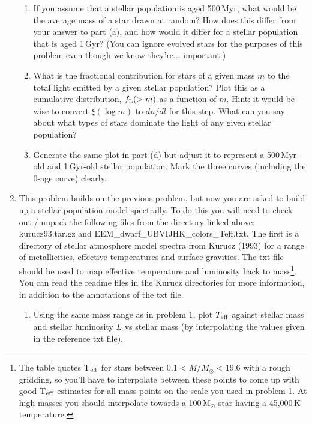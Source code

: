 \documentclass[11pt]{article}
\begin{document}
\begin{enumerate}
\begin{enumerate}
    \item If you assume that a stellar population is aged 500\,Myr,
      what would be the average mass of a star drawn at random?  How
      does this differ from your answer to part (a), and how would it
      differ for a stellar population that is aged 1\,Gyr? (You can
      ignore evolved stars for the purposes of this problem even
      though we know they're... important.)
    \item What is the fractional contribution for stars of a given
      mass $m$ to the total light emitted by a given stellar
      population?  Plot this as a cumulative distribution, $f_{\rm
        L}(>m)$ as a function of $m$.  Hint: it would be wise to
      convert $\xi(\log\!m)$ to $dn/dl$ for this step.  What can you
      say about what types of stars dominate the light of any given
      stellar population?
    \item Generate the same plot in part (d) but adjust it to
      represent a 500\,Myr-old and 1\,Gyr-old stellar population.
      Mark the three curves (including the 0-age curve) clearly.
\end{enumerate}
  \item This problem builds on the previous problem, but now you are
    asked to build up a stellar population model spectrally.  To do
    this you will need to check out / unpack the following files from
    the directory linked above: kurucz93.tar.gz and
    EEM\_dwarf\_UBVIJHK\_colors\_Teff.txt.  The first is a directory
    of stellar atmosphere model spectra from Kurucz (1993) for a range
    of metallicities, effective temperatures and surface gravities.
    The txt file should be used to map effective temperature and
    luminosity back to mass\footnote{The table quotes T$_{\rm eff}$
      for stars between $0.1<M/M_\odot<19.6$ with a rough gridding, so
      you'll have to interpolate between these points to come up with
      good T$_{\rm eff}$ estimates for all mass points on the scale
      you used in problem 1.  At high masses you should interpolate
      towards a 100\,M$_\odot$ star having a 45,000\,K temperature.}.
    You can read the readme files in the Kurucz directories for more
    information, in addition to the annotations of the txt file.
  \begin{enumerate}
  \item Using the same mass range as in problem 1, plot $T_{\rm
    eff}$ against stellar mass and stellar luminosity $L$ vs stellar
    mass (by interpolating the values given in the reference txt
    file).

\end{enumerate}
\end{enumerate}
\end{document}
